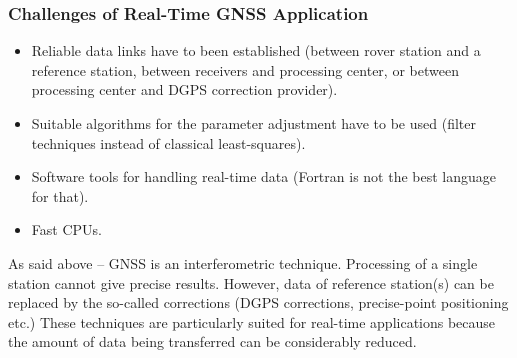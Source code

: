 \documentclass[10pt]{beamer}
\begin{document}
\begin{frame}
\frametitle{Challenges of Real-Time GNSS Application}
\begin{itemize}
\item Reliable data links have to been established (between rover station and a reference station,
  between receivers and processing center, or between processing center and DGPS correction
  provider).
\item Suitable algorithms for the parameter adjustment have to be used (filter techniques instead
  of classical least-squares).
\item Software tools for handling real-time data (Fortran is not the best language for that).
\item Fast CPUs.
\end{itemize}

As said above -- GNSS is an interferometric technique. Processing of a single station cannot give
precise results. However, data of reference station(s) can be replaced by the so-called corrections
(DGPS corrections, precise-point positioning etc.) These techniques are particularly suited for
real-time applications because the amount of data being transferred can be considerably reduced.

\end{frame}
\end{document}
